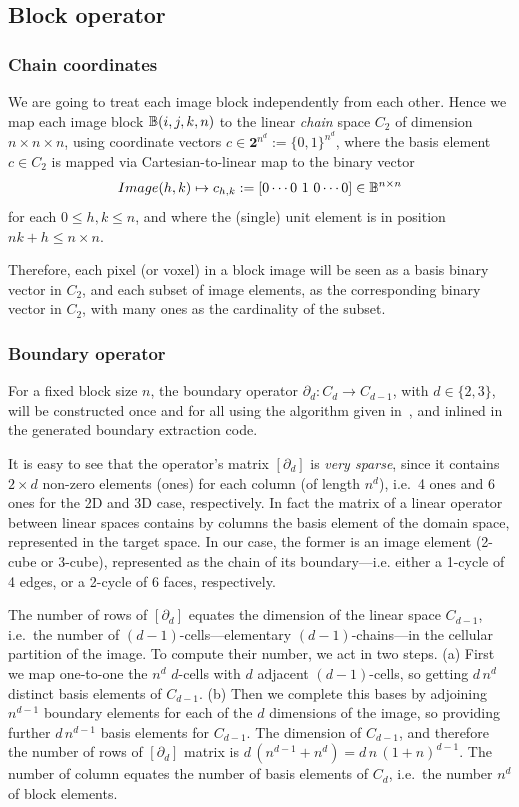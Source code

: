 \subsection{Block operator }\label{sec:block}

\subsubsection*{Chain coordinates }\label{sec:chain-coords}
We are going to treat each image block independently from each other. Hence we map each image block $\mathbb{B}(i,j,k,n)$ to the linear \emph{chain} space $C_2$ of dimension $n\times n\times n$, using coordinate vectors $c\in \mathbf{2}^{n^d} := \{0,1\}^{n^d}$, where the basis element $c \in C_2$ is mapped via Cartesian-to-linear map to the binary vector 
\[
Image(h,k) \mapsto c_{h,k} := [0 \cdots 0\ 1\ 0 \cdots 0] \in \mathbb{B}^{n\times n}
\]
for each $0\leq h,k \leq n$, and where the (single) unit element is in position $nk + h \leq n\times n$.

Therefore, each pixel (or voxel) in a block image will be seen as a basis binary vector in $C_2$, and each subset of image elements, as the corresponding binary vector in $C_2$, with many ones as the cardinality of the subset.

\subsubsection*{Boundary operator }\label{sec:boundary-operator}
For a fixed block size $n$, the boundary operator $\partial_d : C_d\to C_{d-1}$, with $d\in\{2,3\}$, will be constructed once and for all using the algorithm given in~\cite{}, and inlined in the generated boundary extraction code.

It is easy to see that the operator's matrix $[\partial_d]$ is \emph{very sparse}, since it contains $2\times d$ non-zero elements (ones) for each column (of length $n^d$), i.e.~4 ones and 6 ones for the 2D and 3D case, respectively. In fact the matrix of a linear operator between linear spaces contains by columns the basis element of the domain space, represented in the target space. In our case, the former is an image element (2-cube or 3-cube), represented as the chain of its boundary---i.e. either a 1-cycle of 4 edges, or  a 2-cycle of 6 faces, respectively.  

The number of rows of $[\partial_d]$ equates the dimension of the linear space $C_{d-1}$, i.e.~the number of $(d-1)$-cells---elementary $(d-1)$-chains---in the cellular partition of the image. To compute their number, we act in two steps. (a) First we map one-to-one the $n^d$ $d$-cells with $d$ adjacent $(d-1)$-cells, so getting $d\,n^d$ distinct basis elements of $C_{d-1}$. (b) Then we complete this bases by adjoining $n^{d-1}$ boundary elements for each of the $d$ dimensions of the image, so providing further $d\,n^{d-1}$ basis elements for $C_{d-1}$. The dimension of $C_{d-1}$, and therefore the number of rows of $[\partial_d]$ matrix is $d\,(n^{d-1}+n^{d}) = d\,n\,(1+n)^{d-1}$. The number of column equates the number of basis elements of $C_d$, i.e.~the number $n^d$ of block elements.

